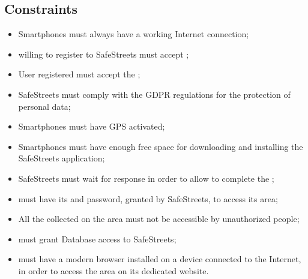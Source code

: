 \documentclass[../../rasd.tex]{subfiles}
\begin{document}
 \subsection{Constraints}
 	\begin{itemize}
 		\item Smartphones must always have a working Internet connection;
 		\item {} willing to register to SafeStreets must accept ;
 		\item User registered must accept the ;
 		\item SafeStreets must comply with the GDPR regulations for the protection of  personal data;
 		\item Smartphones must have GPS activated;
 		\item Smartphones must have enough free space for downloading and installing the SafeStreets application;
 		\item SafeStreets must wait for  response in order to allow  to complete the ;
 		\item {} must have its  and password, granted by SafeStreets, to access its  area;
 		\item All the collected  on the  area must not be accessible by unauthorized people;
 		\item {} must grant  Database access to SafeStreets;
 		\item {} must have a modern browser installed on a device connected to the Internet, in order to access the  area on its dedicated website. 

 	\end{itemize}
\end{document}
